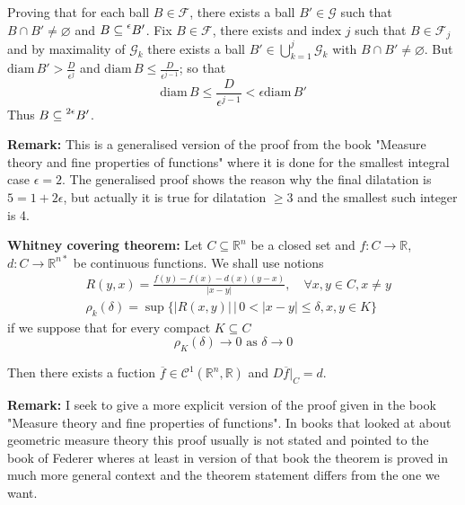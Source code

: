 \documentclass{article}
\begin{document}
\vspace{1ex}
Proving that for each ball $B\in\mathcal{F}$, there exists a ball $B'\in\mathcal{G}$
such that $B\cap B'\neq\varnothing$ and $B\subseteq\prescript{\epsilon}{}B'$. Fix
$B\in\mathcal{F}$, there exists and index $j$ such that $B\in\mathcal{F}_j$ and
by maximality of $\mathcal{G}_k$ there exists a ball $B'\in\bigcup_{k=1}^j
\mathcal{G}_k$ with $B\cap B'\neq\varnothing$. But $\text{diam}\,B'>\frac{D}{\epsilon^j}$
and $\text{diam}\,B\leq\frac{D}{\epsilon^{j-1}}$; so that
\[ \text{diam}\,B\leq \frac{D}{\epsilon^{j-1}} < \epsilon\text{diam}\,B'\]
Thus $B\subseteq\prescript{2\epsilon}{}B'$.

\vspace{1ex}
\textbf{Remark:} This is a generalised version of the proof from the book
"Measure theory and fine properties of functions" where it is done for the
smallest integral case $\epsilon = 2$. The generalised proof shows the reason
why the final dilatation is $5 = 1+2\epsilon$, but actually it is true for
dilatation $\ge 3$ and the smallest such integer is 4.

\vspace{1ex}
\textbf{Whitney covering theorem:}
Let $C\subseteq \mathbb{R}^n$ be a closed set and $f:C\rightarrow\mathbb R$,
$d:C\rightarrow\mathbb{R}^{n*}$ be continuous functions. We shall use notions
\[
\begin{aligned}
    &R(y,x)=\frac{f(y)-f(x)-d(x)(y-x)}{|x-y|},\quad\forall x,y\in C, x\neq y \\
    &\rho_k(\delta)=\sup\{|R(x,y)|\, |\, 0<|x-y|\leq\delta, x, y\in K\}
\end{aligned}
\]
if we suppose that for every compact $K\subseteq C$
\begin{equation}
\rho_K(\delta)\rightarrow 0\text{ as }\delta\rightarrow 0
\end{equation}

Then there exists a fuction $\overline f\in\mathcal{C}^1(\mathbb{R}^n,\mathbb{R})$
and $D\overline f|_C=d$.

\vspace{1ex}
\textbf{Remark:}
I seek to give a more explicit version of the proof given in the book "Measure
theory and fine properties of functions". In books that looked at about
geometric measure theory this proof usually is not stated and pointed to the
book of Federer wheres at least in version of that book the theorem is proved
in much more general context and the theorem statement differs from the one we
want.
\end{document}
